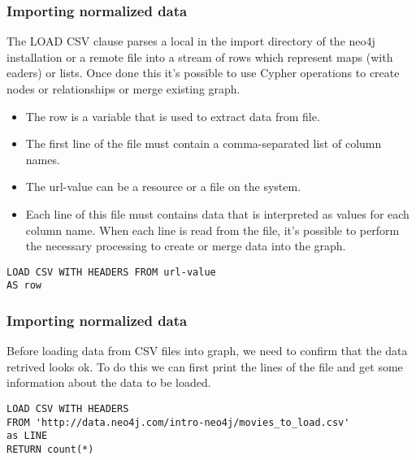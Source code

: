 \begin{frame}[fragile]\frametitle{Importing normalized data}

The LOAD CSV clause parses a local in the import directory of the neo4j installation or a remote file into a stream of rows which represent maps (with eaders) or lists. Once done this it's possible to use Cypher operations to create nodes or relationships or merge existing graph.

\begin{itemize}
\item The row is a variable that is used to extract data from file.
\item The first line of the file must contain a comma-separated list of column names.
\item The url-value can be a resource or a file on the system.
\item Each line of this file must contains data that is interpreted as values for each column name. When each line is read from the file, it's possible to perform the necessary processing to create or merge data into the graph.
\end{itemize}

\begin{lstlisting}
LOAD CSV WITH HEADERS FROM url-value
AS row
\end{lstlisting}

\end{frame}

\begin{frame}[fragile]\frametitle{Importing normalized data}
Before loading data from CSV files into graph, we need to confirm that the data retrived looks ok. To do this we can first print the lines of the file and get some information about the data to be loaded.

\begin{lstlisting}
LOAD CSV WITH HEADERS
FROM 'http://data.neo4j.com/intro-neo4j/movies_to_load.csv'
as LINE
RETURN count(*)
\end{lstlisting}


\end{frame}


